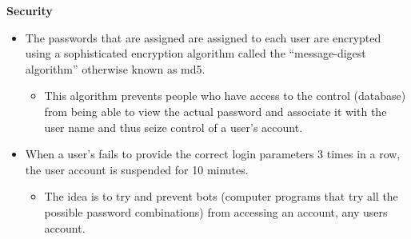\documentclass[10pt,a4paper]{article}
\begin{document}
\pagebreak
\indent\indent\textbf{Security}
                \begin{itemize}
                        \item The passwords that are assigned are assigned to each user are encrypted using a sophisticated encryption algorithm called the “message-digest algorithm” otherwise known as md5.
                        \begin{itemize}
                                \item  This algorithm prevents people who have access to the control (database) from being able to view the actual password and associate it with the user name and thus seize control of a user’s account.
                        \end{itemize}
                        \end{itemize}

                \begin{itemize}
                        \item  When a user’s fails to provide the correct login parameters 3 times in a row, the user account is suspended for 10 minutes.
                        \begin{itemize}
                                \item  The idea is to try and prevent bots (computer programs that try all the possible password combinations) from accessing an account,  any users account.
                        \end{itemize}
                \end{itemize}
\end{document}
